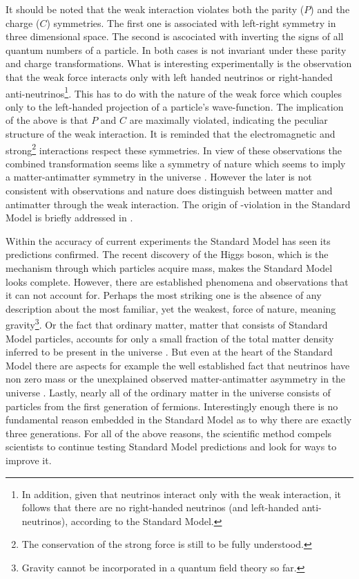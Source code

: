 It should be noted that the weak interaction violates both the parity ($P$) and the charge ($C$) symmetries.
The first one is associated with left-right symmetry in three dimensional space.
The second is ascociated with inverting the signs of all quantum numbers of a particle.
In both cases  is not invariant under these parity and charge transformations. What is interesting experimentally
is the observation \cite{wu-parity,garwin-parity} that the weak force interacts only with left handed neutrinos or right-handed
anti-neutrinos\footnote{In addition, given that neutrinos interact only with the weak interaction, it follows that there are no
right-handed neutrinos (and left-handed anti-neutrinos), according to the Standard Model.}. This has to do with the nature of
the weak force which couples only to the left-handed projection of a particle's
wave-function. The implication of the above is that $P$ and $C$ are maximally violated, indicating the
peculiar structure of the weak interaction. It is reminded that the electromagnetic and
strong\footnote{The \CP conservation of the strong force is still to be fully understood.} interactions
respect these symmetries. In view of these observations the combined \CP transformation
seems like a symmetry of nature which seems to imply a matter-antimatter symmetry in the universe \cite{Sakharov:1967dj}.
However the later is not consistent with observations and nature does distinguish between matter and antimatter through
the weak interaction. The origin of \CP-violation in the Standard Model is briefly addressed in .

Within the accuracy of current experiments the Standard Model has seen its predictions confirmed.
The recent discovery of the Higgs boson, which is the mechanism through which particles acquire mass, makes the Standard Model looks
complete. However, there are established phenomena and observations that it can not
account for. Perhaps the most striking one is the absence of any description about the most familiar, yet the weakest, force of nature,
meaning gravity\footnote{Gravity cannot be incorporated in a quantum field theory so far.}.
Or the fact that ordinary matter, \ie matter that consists of Standard Model particles, accounts for only a small
fraction of the total matter density inferred to be present in the universe \cite{dmatter-Hinshaw}. But even at the heart
of the Standard Model there are aspects for example the well established fact that neutrinos have non zero
mass \cite{nu-mass-superkam,nu-mass-kamland,nu-mass-sno,nu-mass-daya} or the unexplained observed
matter-antimatter asymmetry in the universe \cite{more-cpv-huet,more-cpv-gavela_I,more-cpv-gavela_II}.
Lastly, nearly all of the ordinary matter in the universe consists of
particles from the first generation of fermions. Interestingly enough there is no fundamental reason embedded in the Standard Model
as to why there are exactly three generations. For all of the above reasons, the scientific method compels scientists to continue
testing Standard Model predictions and look for ways to improve it.
